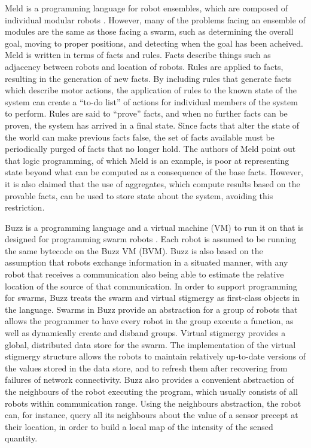 Meld is a programming language for robot ensembles, which are composed of individual modular robots \citep{ashley2007meld}. 
However, many of the problems facing an ensemble of modules are the same as those facing a swarm, such as determining the overall goal, moving to proper positions, and detecting when the goal has been acheived. 
Meld is written in terms of facts and rules. 
Facts describe things such as adjacency between robots and location of robots. 
Rules are applied to facts, resulting in the generation of new facts. 
By including rules that generate facts which describe motor actions, the application of rules to the known state of the system can create a ``to-do list'' of actions for individual members of the system to perform. 
Rules are said to ``prove'' facts, and when no further facts can be proven, the system has arrived in a final state. 
Since facts that alter the state of the world can make previous facts false, the set of facts available must be periodically purged of facts that no longer hold. 
The authors of Meld point out that logic programming, of which Meld is an example, is poor at representing state beyond what can be computed as a consequence of the base facts. 
However, it is also claimed that the use of aggregates, which compute results based on the provable facts, can be used to store state about the system, avoiding this restriction. 

Buzz is a programming language and a virtual machine (VM) to run it on that is designed for programming swarm robots \citep{PinciroliLB15}. 
Each robot is assumed to be running the same bytecode on the Buzz VM (BVM). 
Buzz is also based on the assumption that robots exchange information in a situated manner, with any robot that receives a communication also being able to estimate the relative location of the source of that communication.
In order to support programming for swarms, Buzz treats the swarm and virtual stigmergy as first-class objects in the language. 
Swarms in Buzz provide an abstraction for a group of robots that allows the programmer to have every robot in the group execute a function, as well as dynamically create and disband groups. 
Virtual stigmergy provides a global, distributed data store for the swarm. 
The implementation of the virtual stigmergy structure allows the robots to maintain relatively up-to-date versions of the values stored in the data store, and to refresh them after recovering from failures of network connectivity.
Buzz also provides a convenient abstraction of the neighbours of the robot executing the program, which usually consists of all robots within communication range. 
Using the neighbours abstraction, the robot can, for instance, query all its neighbours about the value of a sensor precept at their location, in order to build a local map of the intensity of the sensed quantity. 

